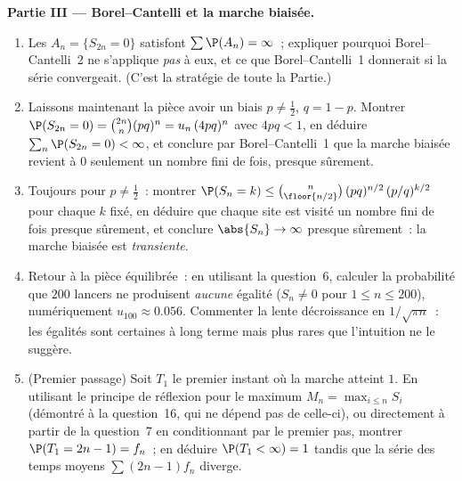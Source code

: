 \begin{problem}
\medskip
\noindent\textbf{Partie III --- Borel--Cantelli et la marche
biaisée.}
\begin{enumerate}[resume]
  \item Les  $A_n = \{S_{2n} = 0\}$ satisfont $\sum\P(A_n)
        = \infty$~; expliquer pourquoi Borel--Cantelli~2 ne
        s'applique \emph{pas} à eux, et ce que Borel--Cantelli~1
        donnerait si la série convergeait. (C'est la
        stratégie de toute la Partie.)
  \item Laissons maintenant la pièce avoir un biais $p \neq \frac12$, $q = 1 -
        p$. Montrer $\P(S_{2n} = 0) = \binom{2n}n(pq)^n =
        u_n\,(4pq)^n$ avec $4pq < 1$, en déduire
        $\sum_n\P(S_{2n} = 0) < \infty$, et conclure par
        Borel--Cantelli~1 que la marche biaisée revient à $0$
        seulement un nombre fini de fois, presque sûrement.
  \item Toujours pour $p \neq \frac12$~: montrer $\P(S_n = k) \leq
        \binom{n}{\floor{n/2}}\,(pq)^{n/2}\,(p/q)^{k/2}$ pour
        chaque $k$ fixé, en déduire que chaque site est visité
        un nombre fini de fois presque sûrement, et conclure
        $\abs{S_n} \to \infty$ presque sûrement~: la marche biaisée
        est \emph{transiente}.
  \item Retour à la pièce équilibrée~: en utilisant la question~6, calculer la
        probabilité que $200$ lancers ne produisent \emph{aucune} égalité
        ($S_n \neq 0$ pour $1 \leq n \leq 200$), numériquement
        $u_{100} \approx 0.056$. Commenter la lente
        décroissance en $1/\sqrt{\pi n}$~: les égalités sont certaines à long
        terme mais plus rares que l'intuition ne le suggère.
  \item (Premier passage) Soit $T_1$ le premier instant où la marche
        atteint $1$. En utilisant le principe de réflexion pour le maximum
        $M_n = \max_{i\leq n}S_i$ (démontré à la question~16,
        qui ne dépend pas de celle-ci), ou directement
        à partir de la question~7 en conditionnant par le premier pas,
        montrer $\P(T_1 = 2n - 1) = f_n$~; en déduire $\P(T_1 <
        \infty) = 1$ tandis que la série des temps moyens
        $\sum(2n-1)f_n$ diverge.
\end{enumerate}


\end{problem}
